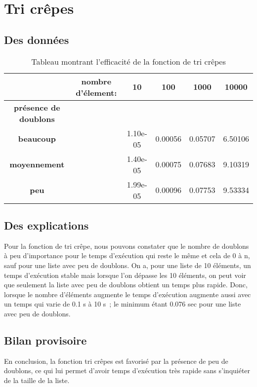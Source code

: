\documentclass[a4paper, 12pt]{article}
\begin{document}
\section{Tri crêpes}
\subsection{Des données}

\begin{table}[htbp]
  \centering
  \begin{tabular}{||c c|c|c|c|c||}\hline
    \textbf{} & \textbf{nombre d'élement:} & \textbf{10} & \textbf{100} & \textbf{1000} & \textbf{10000}\\\hline\hline
    \textbf{présence de doublons} & 	& 	& 	& 	&\\\hline
    \textbf{beaucoup}           &	   & 1.10e-05    & 0.00056	& 0.05707	& 6.50106    \\\hline
    \textbf{moyennement}        &  	   & 1.40e-05    & 0.00075      & 0.07683	& 9.10319    \\\hline
    \textbf{peu}         	&          & 1.99e-05    & 0.00096      & 0.07753	& 9.53334    \\\hline
  \end{tabular}
  \caption{Tableau montrant l'efficacité de la fonction de tri crêpes}
  \label{montableau3}
\end{table}

\subsection{Des explications}

Pour la fonction de tri crêpe, nous pouvons constater que le nombre de doublons à peu d’importance pour le temps d’exécution qui reste le même et cela de 0 à n, sauf pour une liste avec peu de doublons. On a, pour une liste de 10 éléments, un temps d’exécution stable mais lorsque l’on dépasse les 10 éléments, on peut voir que seulement la liste avec peu de doublons obtient un temps plus rapide. Donc, lorsque le nombre d’éléments augmente le temps d’exécution augmente aussi avec un temps qui varie de 0.1 s à 10 s ; le minimum étant 0.076 sec pour une liste avec peu de doublons. 

\subsection{Bilan provisoire}

En conclusion, la fonction tri crêpes est favorisé par la présence de peu de doublons, ce qui lui permet d’avoir temps d’exécution très rapide sans s’inquiéter de la taille de la liste. 
\end{document}

